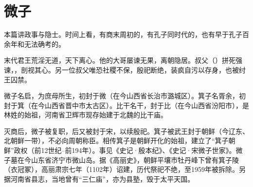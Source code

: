 \chapter{微子}

本篇讲政事与隐士。时间上看，有商末周初的，有孔子同时代的，也有早于孔子百余年和无法确考的。

\bigskip

{
\item {}末代君王荒淫无道，天下离心。他的大哥屡谏无果，离朝隐居。叔父（）拼死强谏，，剖视其心。另一位叔父唯恐社稷不保，殷祀断绝，装疯自污以存身，也被纣王囚禁。

微子名启，为庶母所生，初封于微（在今山西省长治市潞城区）。箕子名胥余，初封于箕（在今山西省晋中市太古区）。比干名干，封于比（在今山西省汾阳市），是林姓的始祖，河南省卫辉市现存始建于北魏的比干庙。

灭商后，微子被复职，后又被封于宋，以续殷祀。箕子被武王封于朝鲜（今辽东、北朝鲜一带），不必向周朝称臣。相传箕子是朝鲜开化的始祖，建立了“箕子朝鲜”政权（前12世纪--前194年）。事见《史记·殷本纪》、《史记·宋微子世家》。微子墓在今山东省济宁市微山岛。据《高丽史》，朝鲜平壤市牡丹峰下曾有箕子陵（衣冠冢），高丽肃宗七年（1102年）诏建，历代祭祀不绝，至1959年被拆除。另据河南省县志，当地曾有“三仁庙”，亦为县塾，毁于太平天国。
}
{}


